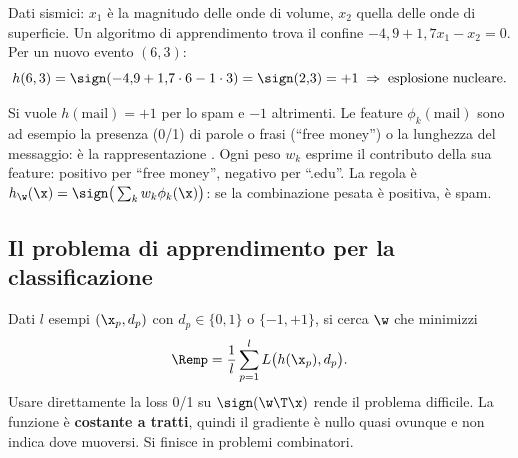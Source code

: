 \begin{esempio}
Dati sismici: $x_1$ è la magnitudo delle onde di volume, $x_2$ quella delle onde di superficie. Un algoritmo di
apprendimento trova il confine $-4{,}9+1{,}7x_1-x_2=0$. Per un nuovo evento $(6,3)$:
\[
h(6,3) = \sign(-4{,}9 + 1{,}7\cdot6 - 1\cdot3) = \sign(2{,}3) = +1 \;\Rightarrow\;\text{esplosione nucleare}.
\]
\vspace{-1.2ex}
\begin{center}
\end{center}
\end{esempio}

\begin{esempio}
Si vuole $h(\text{mail})=+1$ per lo spam e $-1$ altrimenti. Le feature $\phi_k(\text{mail})$ sono ad esempio la
presenza (0/1) di parole o frasi (``free money'') o la lunghezza del messaggio: è la rappresentazione . Ogni peso $w_k$ esprime il contributo della sua feature: positivo per ``free money'', negativo per
``.edu''. La regola è $h_\w(\x) = \sign\big(\sum_k w_k\phi_k(\x)\big)$: se la combinazione pesata è positiva, è
spam.
\end{esempio}

\subsection{Il problema di apprendimento per la classificazione}

Dati $l$ esempi $(\x_p,d_p)$ con $d_p\in\{0,1\}$ o $\{-1,+1\}$, si cerca $\w$ che minimizzi
\[
\Remp = \frac1l\sum_{p=1}^{l}L\big(h(\x_p),d_p\big).
\]
Usare direttamente la loss 0/1 su $\sign(\w\T\x)$ rende il problema difficile. La funzione è \textbf{costante a
tratti}, quindi il gradiente è nullo quasi ovunque e non indica dove muoversi. Si finisce in problemi
combinatori.

